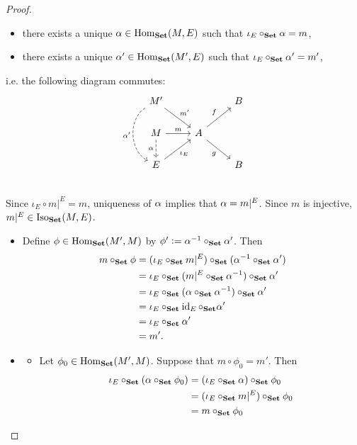 \documentclass{book}
\begin{document}
\begin{proof}
\begin{itemize}
\begin{enumerate}
\begin{itemize}
					\item there exists a unique $\alpha \in \operatorname{Hom}_{\text{\textbf{Set}}}(M, E)$ such that $\iota_E \circ_{\text{\textbf{Set}}} \alpha = m$,
					\item there exists a unique $\alpha' \in \operatorname{Hom}_{\text{\textbf{Set}}}(M', E)$ such that $\iota_E \circ_{\text{\textbf{Set}}} \alpha' = m'$,
				\end{itemize}
				i.e. the following diagram commutes:
				\[ 
				\begin{tikzcd}[baseline= 7]
					M' \arrow[dr, "m'"] \arrow[bend right=60, swap, dashed]{dd}{\al'}&     & B \\
					M \arrow[r, "m"] \arrow[d, "\al"', dashed] & A \arrow[ur, "f"] \arrow[dr, "g"'] &   \\
					E \arrow[ur, "\iota_E"'] &                                  & B \\
				\end{tikzcd}
				\]
				Since $\iota_E \circ m|^E = m$, uniqueness of $\alpha$ implies that $\alpha = m|^E$. Since $m$ is injective, $m|^E \in \operatorname{Iso}_{\text{\textbf{Set}}}(M, E)$. 
				\begin{itemize}
					\item Define $\phi \in \operatorname{Hom}_{\text{\textbf{Set}}}(M', M)$ by $\phi' \vcentcolon= \alpha^{-1} \circ_{\text{\textbf{Set}}} \alpha'$. Then 
					\begin{align*}
						m \circ_{\text{\textbf{Set}}} \phi 
						& = (\iota_E \circ_{\text{\textbf{Set}}} m|^E) \circ_{\text{\textbf{Set}}} (\alpha^{-1} \circ_{\text{\textbf{Set}}} \alpha') \\
						& = \iota_E \circ_{\text{\textbf{Set}}} (m|^E \circ_{\text{\textbf{Set}}} \alpha^{-1}) \circ_{\text{\textbf{Set}}} \alpha' \\
						& = \iota_E \circ_{\text{\textbf{Set}}} (\alpha \circ_{\text{\textbf{Set}}} \alpha^{-1}) \circ_{\text{\textbf{Set}}} \alpha' \\
						& = \iota_E \circ_{\text{\textbf{Set}}} \operatorname{id}_E \circ_{\text{\textbf{Set}}} \alpha' \\
						& = \iota_E \circ_{\text{\textbf{Set}}} \alpha' \\
						& = m'.
					\end{align*}
					\item  
					\begin{itemize}
						\item Let $\phi_0 \in \operatorname{Hom}_{\text{\textbf{Set}}}(M', M)$. Suppose that $m \circ \phi_0 = m'$. Then 
						\begin{align*}
							\iota_E \circ_{\bSet} (\al \circ_{\bSet} \phi_0) 
							& = (\iota_E \circ_{\bSet} \al) \circ_{\bSet} \phi_0 \\
							& = (\iota_E \circ_{\bSet} m|^E) \circ_{\bSet} \phi_0 \\
							& = m \circ_{\bSet} \phi_0 \\

\end{align*}
\end{itemize}
\end{itemize}
\end{enumerate}
\end{itemize}
\end{proof}
\end{document}
